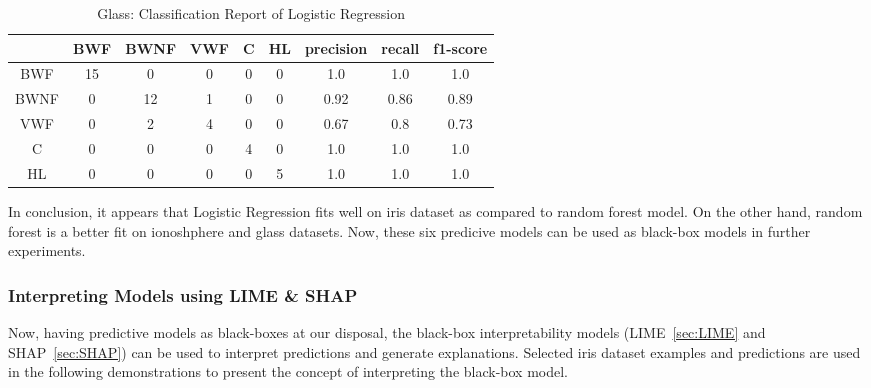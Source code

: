 \documentclass[english]{tktltiki2}
\theoremstyle{definition}
\theoremstyle{remark}
\begin{document}
\begin{table}[H]
	\begin{center}
		\caption{Glass: Classification Report of Logistic Regression}
		\label{table:lr_model_glass_report}
		\begin{tabular}{@{}ccccccccc@{}}
			\toprule
			& BWF & BWNF & VWF & C & HL & precision & recall & f1-score \\ \hline
			\multicolumn{1}{|c|}{BWF} & \multicolumn{1}{c|}{15} & \multicolumn{1}{c|}{0} & \multicolumn{1}{c|}{0} & \multicolumn{1}{c|}{0} & \multicolumn{1}{c|}{0} & \multicolumn{1}{c|}{1.0} & \multicolumn{1}{c|}{1.0} & \multicolumn{1}{c|}{1.0} \\ \hline
			
			\multicolumn{1}{|c|}{BWNF} & \multicolumn{1}{c|}{0} & \multicolumn{1}{c|}{12} & \multicolumn{1}{c|}{1} & \multicolumn{1}{c|}{0} & \multicolumn{1}{c|}{0} & \multicolumn{1}{c|}{0.92} & \multicolumn{1}{c|}{0.86} & \multicolumn{1}{c|}{0.89} \\ \hline
			
			\multicolumn{1}{|c|}{VWF} & \multicolumn{1}{c|}{0} & \multicolumn{1}{c|}{2} & \multicolumn{1}{c|}{4} & \multicolumn{1}{c|}{0} & \multicolumn{1}{c|}{0} & \multicolumn{1}{c|}{0.67} & \multicolumn{1}{c|}{0.8} & \multicolumn{1}{c|}{0.73} \\ \hline
			
			\multicolumn{1}{|c|}{C} & \multicolumn{1}{c|}{0} & \multicolumn{1}{c|}{0} & \multicolumn{1}{c|}{0} & \multicolumn{1}{c|}{4} & \multicolumn{1}{c|}{0} & \multicolumn{1}{c|}{1.0} & \multicolumn{1}{c|}{1.0} & \multicolumn{1}{c|}{1.0} \\ \hline
			
			\multicolumn{1}{|c|}{HL} & \multicolumn{1}{c|}{0} & \multicolumn{1}{c|}{0} & \multicolumn{1}{c|}{0} & \multicolumn{1}{c|}{0} & \multicolumn{1}{c|}{5} & \multicolumn{1}{c|}{1.0} & \multicolumn{1}{c|}{1.0} & \multicolumn{1}{c|}{1.0} \\ \hline
		\end{tabular}
	\end{center}
\end{table}

In conclusion, it appears that Logistic Regression fits well on iris dataset as compared to random forest model. On the other hand, random forest is a better fit on ionoshphere and glass datasets. Now, these six predicive models can be used as black-box models in further experiments.

\subsubsection{Interpreting Models using LIME \& SHAP}
Now, having predictive models as black-boxes at our disposal, the black-box interpretability models (LIME~\ref{sec:LIME} and SHAP~\ref{sec:SHAP}) can be used to interpret predictions and generate explanations. Selected iris dataset examples and predictions are used in the following demonstrations to present the concept of interpreting the black-box model.
\end{document}
